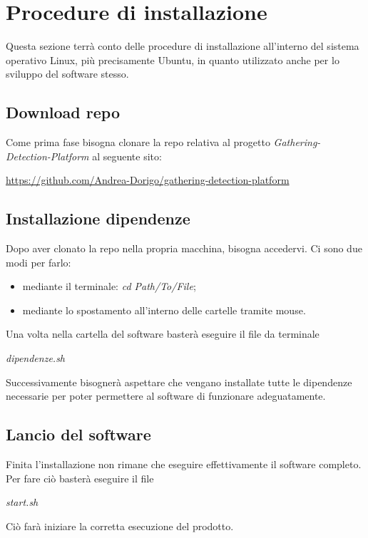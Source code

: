 \chapter{Procedure di installazione}\label{ProceduraDiInstallazione}
Questa sezione terrà conto delle procedure di installazione all'interno del sistema operativo Linux, più precisamente Ubuntu, in quanto utilizzato anche per lo sviluppo del software stesso.

\section{Download repo}\label{ProceduraDiInstallazioneDownloadRepo}
Come prima fase bisogna clonare la repo relativa al progetto \textit{Gathering-Detection-Platform} al seguente sito:
\begin{center}
  \item \url{https://github.com/Andrea-Dorigo/gathering-detection-platform}
\end{center}

\section{Installazione dipendenze}\label{ProceduraDiInstallazioneInstallazioneDipendenze}
Dopo aver clonato la repo nella propria macchina, bisogna accedervi.
Ci sono due modi per farlo:

\begin{itemize}
  \item mediante il terminale: \textit{cd Path/To/File};
  \item mediante lo spostamento all'interno delle cartelle tramite mouse.
\end{itemize}

Una volta nella cartella del software basterà eseguire il file da terminale

\begin{center}
  \textit{dipendenze.sh}

\end{center}
Successivamente bisognerà aspettare che vengano installate tutte le dipendenze necessarie per poter permettere al software di funzionare adeguatamente.

\section{Lancio del software}\label{ProceduraDiInstallazioneLancioDelSoftware}
Finita l'installazione non rimane che eseguire effettivamente il software completo.
Per fare ciò basterà eseguire il file

\begin{center}
  \textit{start.sh}
\end{center}

Ciò farà iniziare la corretta esecuzione del prodotto.
